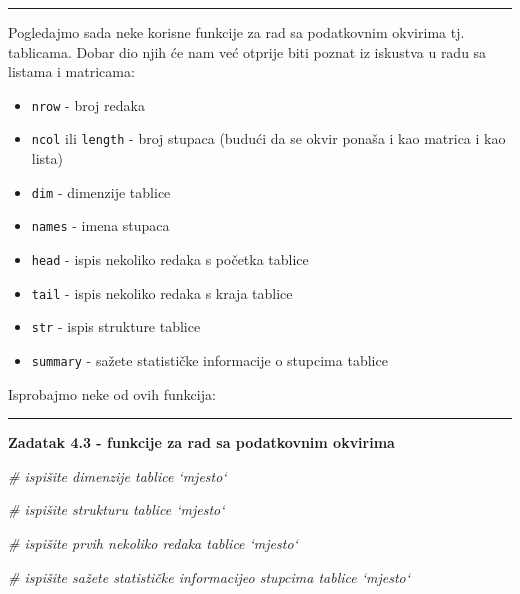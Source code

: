 \documentclass[]{book}
\newenvironment{Shaded}{\begin{snugshade}}{\end{snugshade}}
\newcommand{\CommentTok}[1]{\textcolor[rgb]{0.56,0.35,0.01}{\textit{#1}}}
\providecommand{\tightlist}{%
  \setlength{\itemsep}{0pt}\setlength{\parskip}{0pt}}
\theoremstyle{definition}
\theoremstyle{definition}
\theoremstyle{definition}
\theoremstyle{remark}
\begin{document}
\begin{center}\rule{0.5\linewidth}{\linethickness}\end{center}

Pogledajmo sada neke korisne funkcije za rad sa podatkovnim okvirima tj.
tablicama. Dobar dio njih će nam već otprije biti poznat iz iskustva u
radu sa listama i matricama:

\begin{itemize}
\tightlist
\item
  \texttt{nrow} - broj redaka
\item
  \texttt{ncol} ili \texttt{length} - broj stupaca (budući da se okvir
  ponaša i kao matrica i kao lista)
\item
  \texttt{dim} - dimenzije tablice
\item
  \texttt{names} - imena stupaca
\item
  \texttt{head} - ispis nekoliko redaka s početka tablice
\item
  \texttt{tail} - ispis nekoliko redaka s kraja tablice
\item
  \texttt{str} - ispis strukture tablice
\item
  \texttt{summary} - sažete statističke informacije o stupcima tablice
\end{itemize}

Isprobajmo neke od ovih funkcija:

\begin{center}\rule{0.5\linewidth}{\linethickness}\end{center}

\textbf{Zadatak 4.3 - funkcije za rad sa podatkovnim okvirima}

\begin{Shaded}
\begin{Highlighting}[]
\CommentTok{# ispišite dimenzije tablice `mjesto`}


\CommentTok{# ispišite strukturu tablice `mjesto`}


\CommentTok{# ispišite prvih nekoliko redaka tablice `mjesto`}


\CommentTok{# ispišite sažete statističke informacijeo stupcima tablice `mjesto`}
\end{Highlighting}
\end{Shaded}
\end{document}

